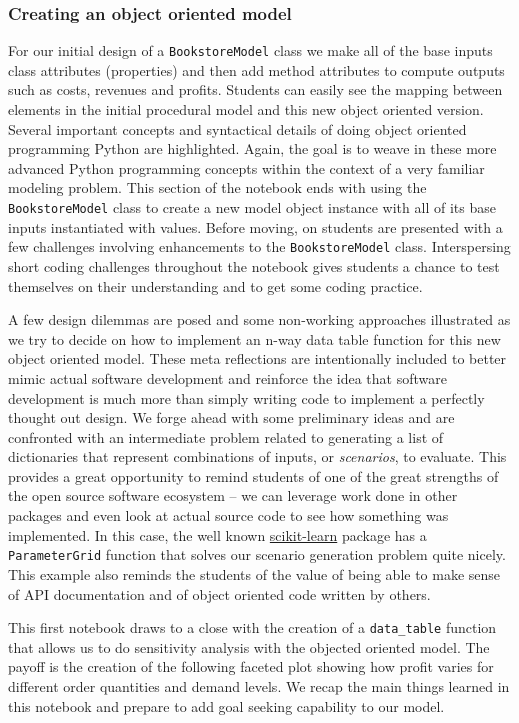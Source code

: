 \documentclass[ited,blindrev]{informs3}              %
\newcommand{\code}[1]{\texttt{#1}}
\begin{document}
\subsubsection{Creating an object oriented model}

For our initial design of a \code{BookstoreModel} class we make all of the base inputs class attributes (properties) and then add method attributes to compute outputs such as costs, revenues and profits. Students can easily see the mapping between elements in the initial procedural model and this new object oriented version. Several important concepts and syntactical details of doing object oriented programming Python are highlighted. Again, the goal is to weave in these more advanced Python programming concepts within the context of a very familiar modeling problem. This section of the notebook ends with using the \code{BookstoreModel} class to create a new model object instance with all of its base inputs instantiated with values. Before moving, on students are presented with a few challenges involving enhancements to the \code{BookstoreModel} class. Interspersing short coding challenges throughout the notebook gives students a chance to test themselves on their understanding and to get some coding practice.

A few design dilemmas are posed and some non-working approaches illustrated as we try to decide on how to implement an n-way data table function for this new object oriented model. These meta reflections are intentionally included to better mimic actual software development and reinforce the idea that software development is much more than simply writing code to implement a perfectly thought out design. We forge ahead with some preliminary ideas and are confronted with an intermediate problem related to generating a list of dictionaries that represent combinations of inputs, or \textit{scenarios}, to evaluate. This provides a great opportunity to remind students of one of the great strengths of the open source software ecosystem -- we can leverage work done in other packages and even look at actual source code to see how something was implemented. In this case, the well known \href{https://scikit-learn.org/stable/}{scikit-learn} package \cite{ScikitlearnMachineLearning} has a \code{ParameterGrid} function that solves our scenario generation problem quite nicely. This example also reminds the students of the value of being able to make sense of API documentation and of object oriented code written by others. 

This first notebook draws to a close with the creation of a \code{data\_table} function that allows us to do sensitivity analysis with the objected oriented model. The payoff is the creation of the following faceted plot showing how profit varies for different order quantities and demand levels. We recap the main things learned in this notebook and prepare to add goal seeking capability to our model.
\end{document}
